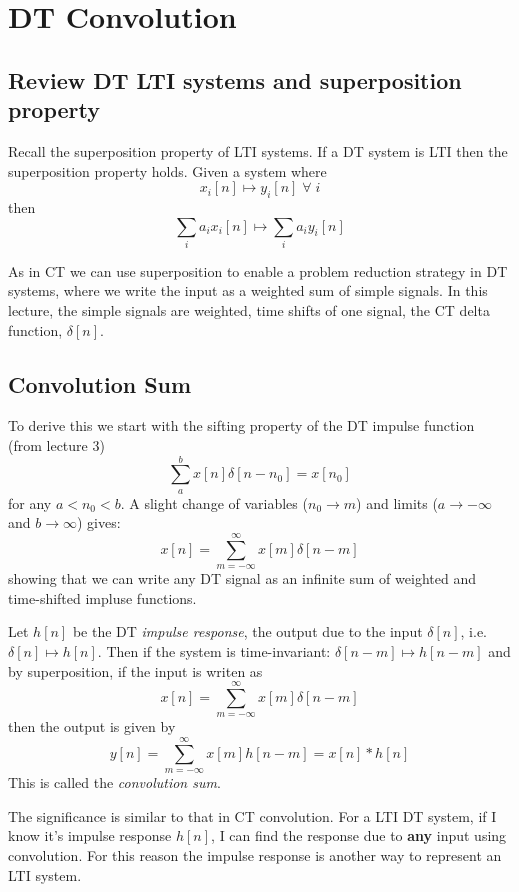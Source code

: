 \section{DT Convolution}

\subsection{Review DT LTI systems and superposition property}

Recall the superposition property of LTI systems. If a DT system is LTI then the superposition property holds. Given a system where
\[   
x_i[n] \mapsto y_i[n] \; \forall\; i
\]
then
\[
\sum\limits_{i} a_i x_i[n] \mapsto \sum\limits_{i} a_i y_i[n] 
\]

As in CT we can use superposition to enable a problem reduction strategy in DT systems, where we write the input as a weighted sum of simple signals.  In this lecture, the simple signals are weighted, time shifts of one signal, the CT delta function, $\delta[n]$.

\subsection{Convolution Sum}

To derive this we start with the sifting property of the DT impulse function (from lecture 3)
\[
\sum\limits_{a}^{b} x[n]\delta[n-n_0] = x[n_0]
\]
for any $a < n_0 < b$. A slight change of variables ($n_0 \rightarrow m$) and limits ($a \rightarrow -\infty$ and $b \rightarrow \infty$) gives:
\[
x[n] = \sum\limits_{m = -\infty}^{\infty} x[m]\delta[n-m]
\]
showing that we can write any DT signal as an infinite sum of weighted and time-shifted impluse functions.

Let $h[n]$ be the DT {\it impulse response}, the output due to the input $\delta[n]$, i.e. $\delta[n] \mapsto h[n]$. Then if the system is time-invariant: $\delta[n-m] \mapsto h[n-m]$ and by superposition, if the input is writen as
\[
x[n] = \sum\limits_{m = -\infty}^{\infty} x[m]\delta[n-m]
\]
then the output is given by
\[
y[n] = \sum\limits_{m = -\infty}^{\infty} x[m]h[n-m] = x[n] * h[n]
\]
This is called the \emph{convolution sum}.

The significance is similar to that in CT convolution. For a LTI DT system, if I know it's impulse response $h[n]$, I can find the response due to \textbf{any} input using convolution. For this reason the impulse response is another way to represent an LTI system.

